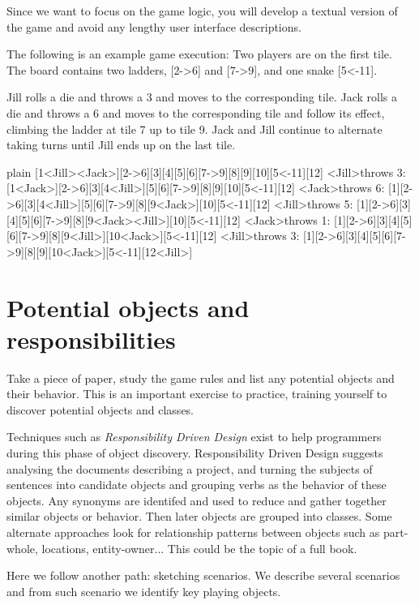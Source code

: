 \documentclass[10pt,twoside,english]{_support/latex/sbabook/sbabook}
\begin{document}
Since we want to focus on the game logic, you will develop a textual version of the game and avoid any lengthy user interface descriptions.

The following is an example game execution: Two players are on the first tile. The board contains two ladders, {[}2-\textgreater{}6{]} and {[}7-\textgreater{}9{]}, and one snake {[}5\textless{}-11{]}.

Jill rolls a die and throws a 3 and moves to the corresponding tile.
Jack rolls a die and throws a 6 and moves to the corresponding tile and follow its effect, climbing the ladder at tile 7 up to tile 9.
Jack and Jill continue to alternate taking turns until Jill ends up on the last tile.

\begin{displaycode}{plain}
[1<Jill><Jack>][2->6][3][4][5][6][7->9][8][9][10][5<-11][12]
<Jill>throws 3: [1<Jack>][2->6][3][4<Jill>][5][6][7->9][8][9][10][5<-11][12]
<Jack>throws 6: [1][2->6][3][4<Jill>][5][6][7->9][8][9<Jack>][10][5<-11][12]
<Jill>throws 5: [1][2->6][3][4][5][6][7->9][8][9<Jack><Jill>][10][5<-11][12]
<Jack>throws 1: [1][2->6][3][4][5][6][7->9][8][9<Jill>][10<Jack>][5<-11][12]
<Jill>throws 3: [1][2->6][3][4][5][6][7->9][8][9][10<Jack>][5<-11][12<Jill>]
\end{displaycode}
\section{Potential objects and responsibilities}
Take a piece of paper, study the game rules and list any potential objects and their behavior. This is an important exercise to practice, training yourself to discover potential objects and classes.

Techniques such as \textit{Responsibility Driven Design} exist to help programmers during this phase of object discovery. Responsibility Driven Design suggests analysing the documents describing a project, and turning the subjects of sentences into candidate objects and grouping verbs as the behavior of these objects. 
Any synonyms are identifed and used to reduce and gather together similar objects or behavior. 
Then later objects are grouped into classes. Some alternate approaches look for relationship patterns between objects such as part-whole, locations, entity-owner... This could be the topic of a full book.

Here we follow another path:  sketching scenarios. We describe several scenarios and from such scenario we identify key playing objects.
\end{document}

